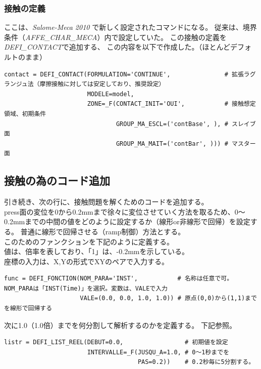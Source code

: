 \documentclass[a4j,11pt,twoside,openany,dvipdfmx]{jsarticle}
\begin{document}
\subsubsection{接触の定義}
ここは、\textit{Salome-Meca 2010} で新しく設定されたコマンドになる。
従来は、境界条件（\textit{AFFE\_CHAR\_MECA}）内で設定していた。
この接触の定義を\textit{DEFI\_CONTACT}で追加する、
この内容を以下で作成した。（ほとんどデフォルトのまま）
\begin{lstlisting}[caption=接触条件,label=contact]
contact = DEFI_CONTACT(FORMULATION='CONTINUE',               # 拡張ラグランジュ法（摩擦接触に対しては安定しており、推奨設定）
                       MODELE=model,
                       ZONE=_F(CONTACT_INIT='OUI',           # 接触想定領域、初期条件
                               GROUP_MA_ESCL=('contBase', ), # スレイブ面
                               GROUP_MA_MAIT=('contBar', ))) # マスター面
\end{lstlisting}
\subsection{接触の為のコード追加}
引き続き、次の行に、接触問題を解くためのコードを追加する。\\
press面の変位を0から0.2mmまで徐々に変位させていく方法を取るため、0〜0.2mmまでの中間の値をどのように設定するか（線形or非線形で回帰）を設定する。
普通に線形で回帰させる（ramp制御）方法とする。\\
このためのファンクションを下記のように定義する。\\
値は、倍率を表しており、「1」は、-0.2mmを示している。\\
座標の入力は、X,Yの形式でXYのペアで入力する。
\begin{lstlisting}[caption=増分関数,label=func]
func = DEFI_FONCTION(NOM_PARA='INST',           # 名称は任意で可。NOM_PARAは「INST(Time)」を選択。変数は、VALEで入力
                     VALE=(0.0, 0.0, 1.0, 1.0)) # 原点(0,0)から(1,1)までを線形で回帰する
\end{lstlisting}
次に1.0（1.0倍）までを何分割して解析するのかを定義する。
下記参照。
\begin{lstlisting}[caption=増分定義,label=listr]
listr = DEFI_LIST_REEL(DEBUT=0.0,                 # 初期値を設定
                       INTERVALLE=_F(JUSQU_A=1.0, # 0～1秒までを
                                     PAS=0.2))    # 0.2秒毎に5分割する。
\end{lstlisting}
\end{document}
